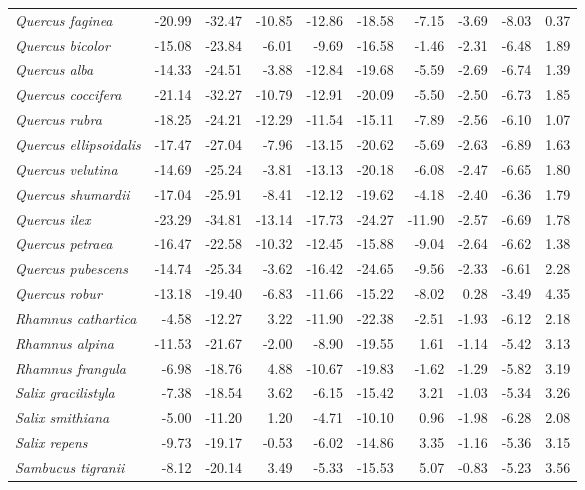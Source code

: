 \documentclass[11pt]{article}
\begin{document}
\begin{longtable}{lrrrrrrrrr}
  \emph{Quercus faginea} & -20.99 & -32.47 & -10.85 & -12.86 & -18.58 & -7.15 & -3.69 & -8.03 & 0.37 \\ 
  \emph{Quercus bicolor} & -15.08 & -23.84 & -6.01 & -9.69 & -16.58 & -1.46 & -2.31 & -6.48 & 1.89 \\ 
  \emph{Quercus alba} & -14.33 & -24.51 & -3.88 & -12.84 & -19.68 & -5.59 & -2.69 & -6.74 & 1.39 \\ 
  \emph{Quercus coccifera} & -21.14 & -32.27 & -10.79 & -12.91 & -20.09 & -5.50 & -2.50 & -6.73 & 1.85 \\ 
  \emph{Quercus rubra} & -18.25 & -24.21 & -12.29 & -11.54 & -15.11 & -7.89 & -2.56 & -6.10 & 1.07 \\ 
  \emph{Quercus ellipsoidalis} & -17.47 & -27.04 & -7.96 & -13.15 & -20.62 & -5.69 & -2.63 & -6.89 & 1.63 \\ 
  \emph{Quercus velutina} & -14.69 & -25.24 & -3.81 & -13.13 & -20.18 & -6.08 & -2.47 & -6.65 & 1.80 \\ 
  \emph{Quercus shumardii} & -17.04 & -25.91 & -8.41 & -12.12 & -19.62 & -4.18 & -2.40 & -6.36 & 1.79 \\ 
  \emph{Quercus ilex} & -23.29 & -34.81 & -13.14 & -17.73 & -24.27 & -11.90 & -2.57 & -6.69 & 1.78 \\ 
  \emph{Quercus petraea} & -16.47 & -22.58 & -10.32 & -12.45 & -15.88 & -9.04 & -2.64 & -6.62 & 1.38 \\ 
  \emph{Quercus pubescens} & -14.74 & -25.34 & -3.62 & -16.42 & -24.65 & -9.56 & -2.33 & -6.61 & 2.28 \\ 
  \emph{Quercus robur} & -13.18 & -19.40 & -6.83 & -11.66 & -15.22 & -8.02 & 0.28 & -3.49 & 4.35 \\ 
  \emph{Rhamnus cathartica} & -4.58 & -12.27 & 3.22 & -11.90 & -22.38 & -2.51 & -1.93 & -6.12 & 2.18 \\ 
  \emph{Rhamnus alpina} & -11.53 & -21.67 & -2.00 & -8.90 & -19.55 & 1.61 & -1.14 & -5.42 & 3.13 \\ 
  \emph{Rhamnus frangula} & -6.98 & -18.76 & 4.88 & -10.67 & -19.83 & -1.62 & -1.29 & -5.82 & 3.19 \\ 
  \emph{Salix gracilistyla} & -7.38 & -18.54 & 3.62 & -6.15 & -15.42 & 3.21 & -1.03 & -5.34 & 3.26 \\ 
  \emph{Salix smithiana} & -5.00 & -11.20 & 1.20 & -4.71 & -10.10 & 0.96 & -1.98 & -6.28 & 2.08 \\ 
  \emph{Salix repens} & -9.73 & -19.17 & -0.53 & -6.02 & -14.86 & 3.35 & -1.16 & -5.36 & 3.15 \\ 
  \emph{Sambucus tigranii} & -8.12 & -20.14 & 3.49 & -5.33 & -15.53 & 5.07 & -0.83 & -5.23 & 3.56 \\ 

\end{longtable}
\end{document}
